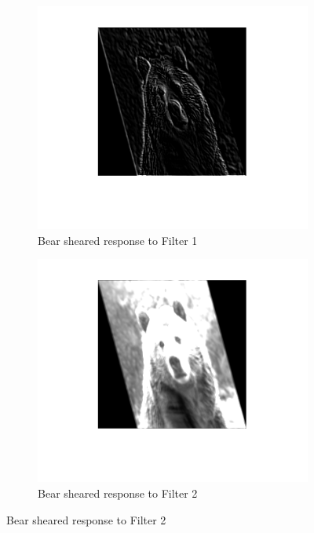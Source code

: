 \documentclass[a4paper]{iacas}
\begin{document}
\begin{figure}
  \begin{subfigure}{0.4\linewidth}
	\includegraphics[width=\linewidth]{imgs/bear_sheared_filtered_1.png}
	\caption{Bear sheared response to Filter 1}
  \end{subfigure}
  \begin{subfigure}{0.4\linewidth}
	\includegraphics[width=\linewidth]{imgs/bear_sheared_filtered_2.png}
	\caption{Bear sheared response to Filter 2}
  \end{subfigure}


\end{figure}
\end{document}
